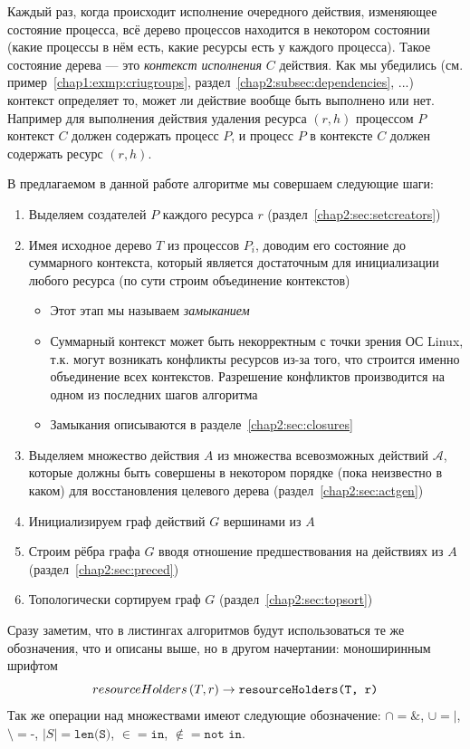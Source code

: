 Каждый раз, когда происходит исполнение очередного действия, изменяющее состояние процесса, всё дерево процессов находится в некотором состоянии (какие процессы в нём есть, какие ресурсы есть у каждого процесса). Такое состояние дерева --- это \emph{контекст исполнения} $C$ действия. Как мы убедились (см. пример~\ref{chap1:exmp:criugroups}, раздел~\ref{chap2:subsec:dependencies}, ...) контекст определяет то, может ли действие вообще быть выполнено или нет.
Например для выполнения действия удаления ресурса $(r, h)$ процессом $P$ контекст $C$ должен содержать процесс $P$, и процесс $P$ в контексте $C$ должен содержать ресурс $(r, h)$.

В предлагаемом в данной работе алгоритме мы совершаем следующие шаги:

\begin{enumerate}
	\item Выделяем создателей $P$ каждого ресурса $r$ (раздел~\ref{chap2:sec:setcreators})
	\item Имея исходное дерево $T$ из процессов $P_i$, доводим его состояние до суммарного контекста, который является достаточным для инициализации любого ресурса (по сути строим объединение контекстов)
	\begin{itemize}
		\item Этот этап мы называем \emph{замыканием}
		\item Суммарный контекст может быть некорректным с точки зрения ОС Linux, т.к. могут возникать конфликты ресурсов из-за того, что строится именно объединение всех контекстов. Разрешение конфликтов производится на одном из последних шагов алгоритма
		\item Замыкания описываются в разделе~\ref{chap2:sec:closures}
	\end{itemize}
	\item Выделяем множество действия $A$ из множества всевозможных действий $\mathcal{A}$, которые должны быть совершены в некотором порядке (пока неизвестно в каком) для восстановления целевого дерева (раздел~\ref{chap2:sec:actgen})
	\item Инициализируем граф действий $G$ вершинами из $A$
	\item Строим рёбра графа $G$ вводя отношение предшествования на действиях из $A$ (раздел~\ref{chap2:sec:preced})
	\item Топологически сортируем граф $G$ (раздел~\ref{chap2:sec:topsort})
\end{enumerate}

Сразу заметим, что в листингах алгоритмов будут использоваться те же обозначения, что и описаны выше, но в другом начертании: моноширинным шрифтом
\begin{equation*}
resourceHolders\left( T, r \right) \rightarrow \texttt{resourceHolders(T, r)}
\end{equation*}
Так же операции над множествами имеют следующие обозначение: $\cap = \texttt{\&}$, $\cup = \texttt{|}$, $\setminus = \texttt{-}$, $|S| = \texttt{len(S)}$, $\in = \texttt{in}$, $\notin = \texttt{not in}$.


